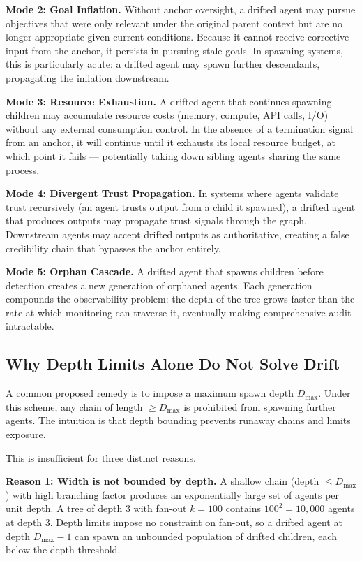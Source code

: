 \textbf{Mode 2: Goal Inflation.}
Without anchor oversight, a drifted agent may pursue objectives that were only relevant under the original parent context but are no longer appropriate given current conditions. Because it cannot receive corrective input from the anchor, it persists in pursuing stale goals. In spawning systems, this is particularly acute: a drifted agent may spawn further descendants, propagating the inflation downstream.

\textbf{Mode 3: Resource Exhaustion.}
A drifted agent that continues spawning children may accumulate resource costs (memory, compute, API calls, I/O) without any external consumption control. In the absence of a termination signal from an anchor, it will continue until it exhausts its local resource budget, at which point it fails — potentially taking down sibling agents sharing the same process.

\textbf{Mode 4: Divergent Trust Propagation.}
In systems where agents validate trust recursively (an agent trusts output from a child it spawned), a drifted agent that produces outputs may propagate trust signals through the graph. Downstream agents may accept drifted outputs as authoritative, creating a false credibility chain that bypasses the anchor entirely.

\textbf{Mode 5: Orphan Cascade.}
A drifted agent that spawns children before detection creates a new generation of orphaned agents. Each generation compounds the observability problem: the depth of the tree grows faster than the rate at which monitoring can traverse it, eventually making comprehensive audit intractable.

\subsection{Why Depth Limits Alone Do Not Solve Drift}

A common proposed remedy is to impose a maximum spawn depth $D_{\max}$. Under this scheme, any chain of length $\geq D_{\max}$ is prohibited from spawning further agents. The intuition is that depth bounding prevents runaway chains and limits exposure.

This is insufficient for three distinct reasons.

\textbf{Reason 1: Width is not bounded by depth.}
A shallow chain (depth $\leq D_{\max}$) with high branching factor produces an exponentially large set of agents per unit depth. A tree of depth $3$ with fan-out $k=100$ contains $100^2 = 10{,}000$ agents at depth $3$. Depth limits impose no constraint on fan-out, so a drifted agent at depth $D_{\max} - 1$ can spawn an unbounded population of drifted children, each below the depth threshold.

